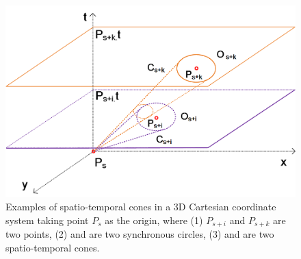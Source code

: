 




\begin{figure}[tb!]
	\centering
	\includegraphics[scale=0.70]{figures/Fig-CIS.png}
	\vspace{-1ex}
	\caption{\small Examples of spatio-temporal cones in a 3D Cartesian coordinate system taking point $P_s$ as the origin, where (1) $P_{s+i}$ and $P_{s+k}$ are two points, (2)  and  are two synchronous circles, (3)  and  are two spatio-temporal cones.}
	\vspace{-2ex}
	\label{fig:cis}
\end{figure}

